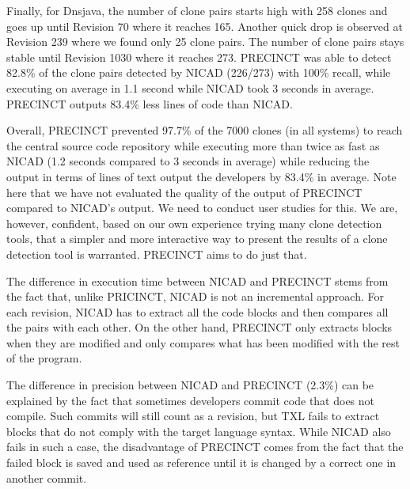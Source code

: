 Finally, for Dnsjava, the number of clone pairs starts high with 258 clones and goes up until Revision 70 where it reaches 165. Another quick drop is observed at Revision 239 where we found only 25 clone pairs. The number of clone pairs stays stable until Revision 1030 where it reaches 273. PRECINCT was able to detect 82.8\% of the clone pairs detected by NICAD (226/273) with 100\% recall, while executing on average in 1.1 second while NICAD took 3 seconds in average. PRECINCT outputs  83.4\% less lines of code than NICAD.

Overall, PRECINCT prevented 97.7\% of the 7000 clones (in all systems) to reach the central source code repository while executing more than twice as fast as NICAD (1.2 seconds compared to 3 seconds in average) while reducing the output in terms of lines of text output the developers by 83.4\% in average. Note here that we have not evaluated the quality of the output of PRECINCT compared to NICAD's output. We need to conduct user studies for this. We are, however, confident, based on our own experience trying many clone detection tools, that a simpler and more interactive way to present the results of a clone detection tool is warranted. PRECINCT aims to do just that.

The difference in execution time between NICAD and PRECINCT stems from the fact that, unlike PRICINCT, NICAD is not an incremental approach. For each revision, NICAD has to extract all the code blocks and then compares all the pairs with each other. On the other hand, PRECINCT only extracts blocks when they are modified and only compares what has been modified with the rest of the program.

The difference in precision between NICAD and PRECINCT (2.3\%)  can be explained by the fact that sometimes developers commit code that does not compile.
Such commits will still count as a revision, but TXL fails to extract blocks that do not comply with the target language syntax.
While NICAD also fails in such a case, the disadvantage of PRECINCT comes from the fact that the failed block is saved and used as reference until it is changed by a correct one in another commit.
